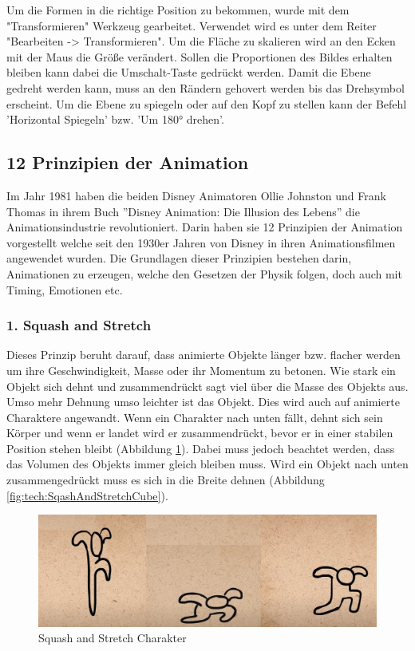 Um die Formen in die richtige Position zu bekommen, wurde mit dem "Transformieren" Werkzeug
gearbeitet. Verwendet wird es unter dem Reiter "Bearbeiten -> Transformieren".
Um die Fläche zu skalieren wird an den Ecken mit der Maus die Größe verändert. Sollen die Proportionen des Bildes erhalten bleiben
kann dabei die Umschalt-Taste gedrückt werden. Damit die Ebene gedreht werden kann, muss an den Rändern gehovert werden bis das Drehsymbol erscheint.
Um die Ebene zu spiegeln oder auf den Kopf zu stellen kann der Befehl 'Horizontal Spiegeln' bzw. 'Um 180° drehen'.

\subsection{12 Prinzipien der Animation}
Im Jahr 1981 haben die beiden Disney Animatoren Ollie Johnston und Frank Thomas in ihrem Buch ''Disney Animation: Die Illusion des Lebens'' die Animationsindustrie revolutioniert.
Darin haben sie 12 Prinzipien der Animation vorgestellt welche seit den 1930er Jahren von Disney in ihren Animationsfilmen angewendet wurden.
Die Grundlagen dieser Prinzipien bestehen darin, Animationen zu erzeugen, welche den Gesetzen der Physik folgen, doch auch mit Timing, Emotionen etc.

\subsubsection{1. Squash and Stretch}
Dieses Prinzip beruht darauf, dass animierte Objekte länger bzw. flacher werden um ihre Geschwindigkeit, Masse oder ihr Momentum zu betonen.
Wie stark ein Objekt sich dehnt und zusammendrückt sagt viel über die Masse des Objekts aus. Umso mehr Dehnung umso leichter ist das Objekt.
Dies wird auch auf animierte Charaktere angewandt. Wenn ein Charakter nach unten fällt, dehnt sich sein Körper und wenn er landet wird er zusammendrückt, bevor er in einer stabilen Position stehen bleibt (Abbildung \ref{fig:tech:SqashAndStretch}).
Dabei muss jedoch beachtet werden, dass das Volumen des Objekts immer gleich bleiben muss. Wird ein Objekt nach unten zusammengedrückt muss es sich in die Breite dehnen (Abbildung \ref{fig:tech:SqashAndStretchCube}).
\begin{figure}[H]
    \centering
    \includegraphics[scale=0.5]{pics/SqashAndStretch.png}
    \caption{Squash and Stretch Charakter}
    \label{fig:tech:SqashAndStretch}
\end{figure}

